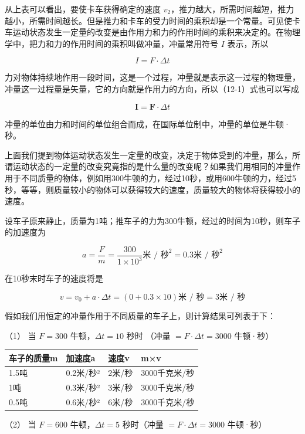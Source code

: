 从上表可以看出，要使卡车获得确定的速度
\(v_{2}\)，推力越大，所需时间越短，推力越小，所需时间越长。但是推力和卡车的受力时间的乘积却是一个常量。可见使卡车运动状态发生一定量的改变是由作用力和力的作用时间的乘积来决定的。在物理学中，把力和力的作用时间的乘积叫做冲量，冲量常用符号
\(I\) 表示，所以

\[
I = F \cdot \Delta t \tag{12.1}
\]

力对物体持续地作用一段时间，这是一个过程，冲量就是表示这一过程的物理量，冲量这一过程量是矢量，它的方向就是作用力的方向，所以（12-1）式也可以写成

\[
\boldsymbol {I} = \boldsymbol {F} \cdot \Delta t \tag{12.2}
\]

冲量的单位由力和时间的单位组合而成，在国际单位制中，冲量的单位是牛顿·秒。

上面我们提到物体运动状态发生一定量的改变，决定于物体受到的冲量，那么，所谓运动状态的一定量的改变究竟指的是什么量的改变呢？如果我们用相同的冲量作用于不同质量的物体，例如用300牛顿的力，经过10秒，或用600牛顿的力，经过5秒，等等，则质量较小的物体可以获得较大的速度，质量较大的物体将获得较小的速度。

设车子原来静止，质量为1吨；推车子的力为300牛顿，经过的时间为10秒，则车子的加速度为

\[
a = \frac {F}{m} = \frac {300}{1 \times 10 ^ {3}} \text{米 / 秒} ^ {2} = 0.3 \text{米 / 秒} ^ {2}
\]

在10秒末时车子的速度将是

\[
v = v _ {0} + a \cdot \Delta t = (0 + 0.3 \times 10) \text{米 / 秒} = 3 \text{米 / 秒}
\]

假如我们用恒定的冲量作用于不同质量的车子上，则计算结果可列表于下：

（1） 当 \(F = 300\) 牛顿，\(\Delta t = 10\) 秒时 （冲量
\(= F \cdot \Delta t = 3000\) 牛顿·秒）

{\def\LTcaptype{none} %
\begin{longtable}[]{@{}llll@{}}
\toprule\noalign{}
车子的质量m & 加速度a & 速度v & m×v \\
\midrule\noalign{}
\endhead
\bottomrule\noalign{}
\endlastfoot
1.5吨 & 0.2米/秒² & 2米/秒 & 3000千克米/秒 \\
1吨 & 0.3米/秒² & 3米/秒 & 3000千克米/秒 \\
0.5吨 & 0.6米/秒² & 6米/秒 & 3000千克米/秒 \\
\end{longtable}
}

（2） 当 \(F = 600\) 牛顿，\(\Delta t = 5\) 秒时（冲量
\(= F \cdot \Delta t = 3000\) 牛顿·秒）

